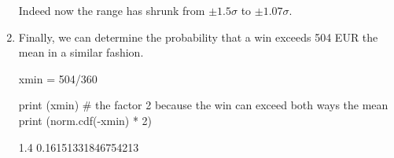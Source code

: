 \begin{solution}
\begin{enumerate}[label={\emph{\alph*})}]
Indeed now the range has shrunk from $\pm1.5\sigma$ to $\pm1.07\sigma$. 

\item Finally, we can determine the probability that a win exceeds 504 EUR the mean in a similar fashion.

\begin{ipython}
xmin = 504/360

print (xmin)
# the factor 2 because the win can exceed both ways the mean
print (norm.cdf(-xmin) * 2)
\end{ipython}
\begin{ioutput}
1.4
0.16151331846754213
\end{ioutput}
\end{enumerate}
\end{solution}
